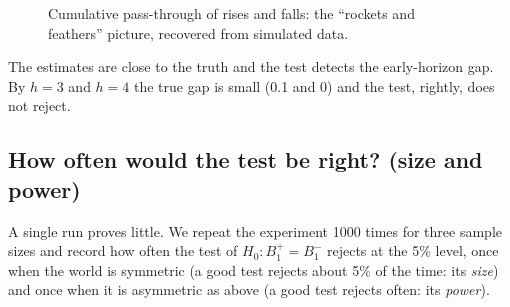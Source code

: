 \documentclass[11pt,a4paper]{article}
\theoremstyle{definition}
\newcommand{\AI}{\mathrm{AI}}
\begin{document}
\begin{table}[h]
\centering

\caption{True and estimated lag coefficients from OLS on the simulated sample; Newey--West standard errors in parentheses.}
\end{table}

\begin{table}[h]
\centering

\caption{Cumulative rocket--feather gap $\hat{\AI}_h = \hat B^{+}_h-\hat B^{-}_h$ and its $p$-value. The true gaps are $0.4,\,0.4,\,0.2,\,0.1,\,0$ for $h=0,\dots,4$.}
\end{table}

\begin{figure}[h]
\centering
{}
\caption{Cumulative pass-through of rises and falls: the ``rockets and feathers'' picture, recovered from simulated data.}
\end{figure}

The estimates are close to the truth and the test detects the early-horizon gap. By $h=3$ and $h=4$ the true gap is small (0.1 and 0) and the test, rightly, does not reject.

\subsection{How often would the test be right? (size and power)}

A single run proves little. We repeat the experiment 1000 times for three sample sizes and record how often the test of $H_0:B^{+}_1=B^{-}_1$ rejects at the 5\% level,
once when the world is symmetric (a good test rejects about 5\% of the time: its \emph{size}) and once when it is asymmetric as above (a good test rejects often: its
\emph{power}).
\end{document}
